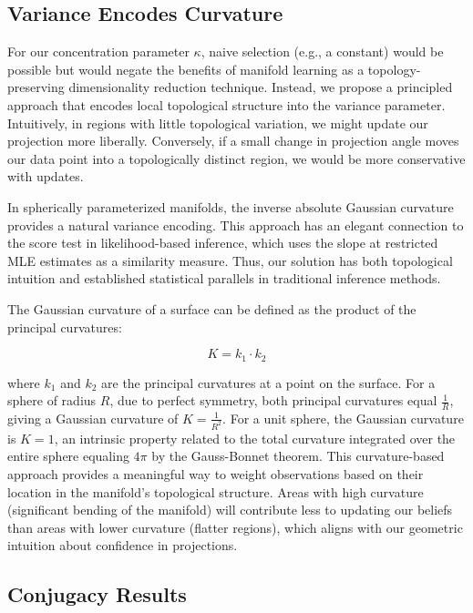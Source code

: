 \documentclass[twoside,11pt]{article}
\begin{document}
\subsection{Variance Encodes Curvature}\label{sc:curvature}

For our concentration parameter $\kappa$, naive selection (e.g., a constant) would be possible but would negate the benefits of manifold learning as a topology-preserving dimensionality reduction technique. Instead, we propose a principled approach that encodes local topological structure into the variance parameter. Intuitively, in regions with little topological variation, we might update our projection more liberally. Conversely, if a small change in projection angle moves our data point into a topologically distinct region, we would be more conservative with updates.

In spherically parameterized manifolds, the inverse absolute Gaussian curvature provides a natural variance encoding. This approach has an elegant connection to the score test in likelihood-based inference, which uses the slope at restricted MLE estimates as a similarity measure. Thus, our solution has both topological intuition and established statistical parallels in traditional inference methods.

The Gaussian curvature of a surface can be defined as the product of the principal curvatures:

$$K = k_1 \cdot k_2$$

where $k_1$ and $k_2$ are the principal curvatures at a point on the surface. For a sphere of radius $R$, due to perfect symmetry, both principal curvatures equal $\frac{1}{R}$, giving a Gaussian curvature of $K = \frac{1}{R^2}$. For a unit sphere, the Gaussian curvature is $K = 1$, an intrinsic property related to the total curvature integrated over the entire sphere equaling $4\pi$ by the Gauss-Bonnet theorem. This curvature-based approach provides a meaningful way to weight observations based on their location in the manifold's topological structure. Areas with high curvature (significant bending of the manifold) will contribute less to updating our beliefs than areas with lower curvature (flatter regions), which aligns with our geometric intuition about confidence in projections.

\subsection{Conjugacy Results}\label{sc:conjugacy}
\end{document}
